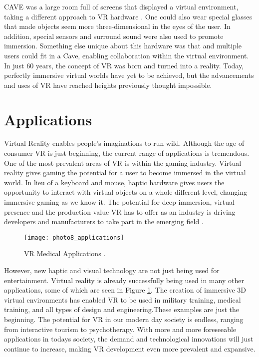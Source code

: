 CAVE was a large room full of screens that displayed a virtual environment, taking a different approach to VR hardware \cite{mihelj_apps}. One could also wear special glasses that made objects seem more three-dimensional in the eyes of the user. In addition, special sensors and surround sound were also used to promote immersion. Something else unique about this hardware was that and multiple users could fit in a Cave, enabling collaboration within the virtual environment. In just 60 years, the concept of VR was born and turned into a reality. Today, perfectly immersive virtual worlds have yet to be achieved, but the advancements and uses of VR have reached heights previously thought impossible. 



\section{Applications}\label{Apps}

Virtual Reality enables people's imaginations to run wild. Although the age of consumer VR is just beginning, the current range of applications is tremendous. One of the most prevalent areas of VR is within the gaming industry. Virtual reality gives gaming the potential for a user to become immersed in the virtual world. In lieu of a keyboard and mouse, haptic hardware gives users the opportunity to interact with virtual objects on a whole different level, changing immersive gaming as we know it. The potential for deep immersion, virtual presence and the production value  VR has to offer as an industry is driving developers and manufacturers to take part in the emerging field \cite{parisi}.   

 \begin{figure}[h]
	\centering
	\texttt{[image: photo8\_applications]}
	\caption{VR Medical Applications \cite{applications}.}
	\label{fig:applications}
\end{figure}

However, new haptic and visual technology are not just being used for entertainment. Virtual reality is already successfully being used in many other applications, some of which are seen in Figure \ref{fig:applications}. The creation of immersive 3D virtual environments has enabled VR to be used in military training, medical training, and all types of design and engineering.These examples are just the beginning. The potential for VR in our modern day society is endless, ranging from interactive tourism to psychotherapy. With more and more foreseeable applications in todays society, the demand and technological innovations will just continue to increase, making VR development even more prevalent and expansive. 


